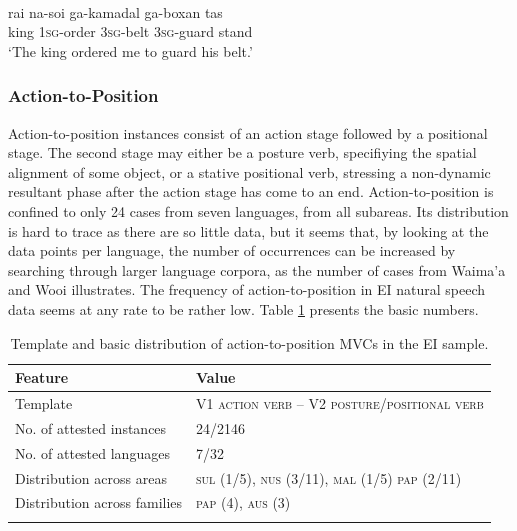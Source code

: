 \ea \label{Teiwa002}
\\
\gll rai na-soi ga-kamadal ga-boxan tas \\
king \textsc{1}\textsc{sg}-order \textsc{3}\textsc{sg}-belt \textsc{3}\textsc{sg}-guard stand \\
\glft `The king ordered me to guard his belt.'\\ 
\z

\subsubsection{Action-to-Position}\label{sec:action-to-position}

Action-to-position instances consist of an action stage followed by a positional stage. The second stage may either be a posture verb, specifiying the spatial alignment of some object, or a stative positional verb, stressing a non-dynamic resultant phase after the action stage has come to an end. Action-to-position is confined to only 24 cases from seven languages, from all subareas. Its distribution is hard to trace as there are so little data, but it seems that, by looking at the data points per language, the number of occurrences can be increased by searching through larger language corpora, as the number of cases from Waima'a and Wooi illustrates. The frequency of action-to-position in EI natural speech data seems at any rate to be rather low. Table \ref{table:action-to-position} presents the basic numbers.

\begin{table}
\begin{tabular}{ll}
\lsptoprule
Feature&Value\tabularnewline
\hline
Template&V1 \textsc{action verb} -- V2 \textsc{posture/positional verb}\tabularnewline
No. of attested instances& 24/2146 \tabularnewline
No. of attested languages& 7/32 \tabularnewline
Distribution across areas& \textsc{sul} (1/5), \textsc{nus} (3/11), \textsc{mal} (1/5) \textsc{pap} (2/11) \tabularnewline
Distribution across families& \textsc{pap} (4), \textsc{aus} (3) \tabularnewline
\lspbottomrule
\end{tabular}
\caption[Template and basic distribution of action-to-position MVCs]{Template and basic distribution of action-to-position MVCs in the EI sample.}
\label{table:action-to-position}
\end{table}


